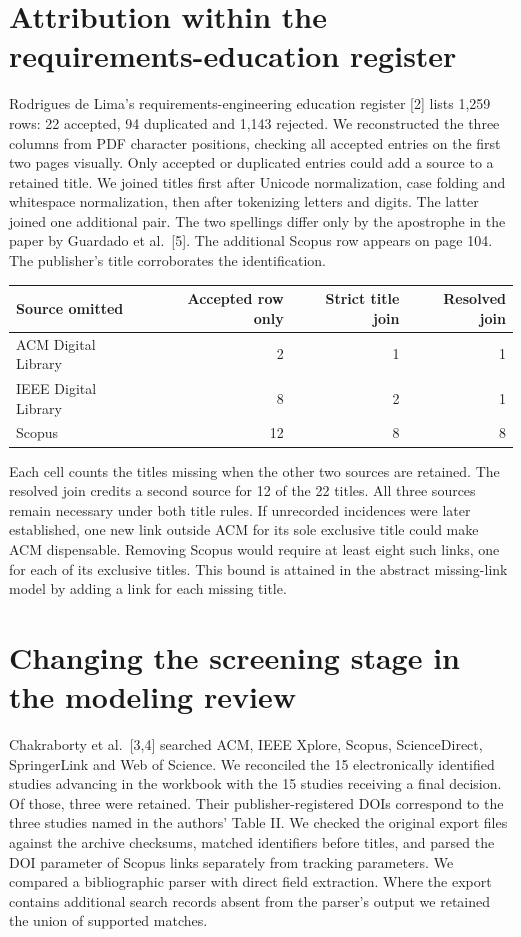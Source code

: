 \documentclass[11pt]{article}
\begin{document}
\section{Attribution within the requirements-education register}
Rodrigues de Lima's requirements-engineering education register [2] lists 1,259 rows: 22 accepted, 94 duplicated and 1,143 rejected. We reconstructed the three columns from PDF character positions, checking all accepted entries on the first two pages visually. Only accepted or duplicated entries could add a source to a retained title. We joined titles first after Unicode normalization, case folding and whitespace normalization, then after tokenizing letters and digits. The latter joined one additional pair. The two spellings differ only by the apostrophe in the paper by Guardado et al.\ [5]. The additional Scopus row appears on page 104. The publisher's title corroborates the identification.
\begin{center}
\begin{tabular}{lrrr}\toprule
Source omitted & Accepted row only & Strict title join & Resolved join\\\midrule
ACM Digital Library & 2 & 1 & 1\\
IEEE Digital Library & 8 & 2 & 1\\
Scopus & 12 & 8 & 8\\\bottomrule
\end{tabular}
\end{center}
Each cell counts the titles missing when the other two sources are retained. The resolved join credits a second source for 12 of the 22 titles. All three sources remain necessary under both title rules. If unrecorded incidences were later established, one new link outside ACM for its sole exclusive title could make ACM dispensable. Removing Scopus would require at least eight such links, one for each of its exclusive titles. This bound is attained in the abstract missing-link model by adding a link for each missing title.

\section{Changing the screening stage in the modeling review}
Chakraborty et al.\ [3,4] searched ACM, IEEE Xplore, Scopus, ScienceDirect, SpringerLink and Web of Science. We reconciled the 15 electronically identified studies advancing in the workbook with the 15 studies receiving a final decision. Of those, three were retained. Their publisher-registered DOIs correspond to the three studies named in the authors' Table II. We checked the original export files against the archive checksums, matched identifiers before titles, and parsed the DOI parameter of Scopus links separately from tracking parameters. We compared a bibliographic parser with direct field extraction. Where the export contains additional search records absent from the parser's output we retained the union of supported matches.
\end{document}
